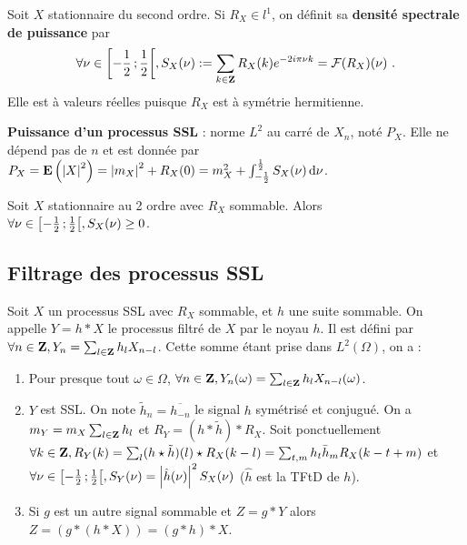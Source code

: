 	\begin{defn}
		Soit $X$ stationnaire du second ordre.
		Si $R_X \in l^1$, on définit sa \textbf{densité spectrale de puissance} par
		\vspace{-0.15cm}$$
		\forall \nu \in \intfo{-\frac{1}{2}}{\frac{1}{2}}, S_X(\nu) := \sum_{k \in \Z} R_X(k) e^{-2i\pi \nu k} = \mathcal{F}(R_X)(\nu)\ .
		\vspace{-0.15cm}$$
		Elle est à valeurs réelles puisque $R_X$ est à symétrie hermitienne.
	\end{defn}
	
	\begin{defn}
	\textbf{Puissance d'un processus SSL} : norme $L^2$ au carré de $X_n$, noté $P_X$.
	Elle ne dépend pas de $n$ et est donnée par $P_X = \mathbf{E} \left( \left\lvert X\right\rvert^2 \right) = \left\lvert m_X\right\rvert^2 + R_X(0) = m_X^2 + \int_{-\frac{1}{2}}^{\frac{1}{2}} S_X(\nu) \mathop{}\mathopen{}\mathrm{d} \nu$.
	\end{defn}
	
	\begin{pop}
		Soit $X$ stationnaire au 2 ordre avec $R_X$ sommable.
		Alors $\forall \nu \in \mathopen{}\mathclose{\left[-\frac{1}{2}\mathclose{}\mathpunct{};\frac{1}{2}\right[}, S_X(\nu) \geq 0$.
	\end{pop}

\subsection{Filtrage des processus SSL}

	\begin{pop}
		Soit $X$ un processus SSL avec $R_X$ sommable, et $h$ une suite sommable.
		On appelle $Y = h * X$ le processus filtré de $X$ par le noyau $h$.
		Il est défini par $\forall n \in \mathbf{Z}, Y_n = \sum_{l \in \mathbf{Z}} h_l X_{n - l}$.
		Cette somme étant prise dans $L^2(\Omega)$, on a :
		\begin{enumerate}
		\item
			Pour presque tout $\omega \in \Omega$, $\forall n \in \mathbf{Z}, Y_n(\omega) = \sum_{l \in \mathbf{Z}} h_l X_{n - l}(\omega)$.
		\item
			$Y$ est SSL. On note $\tilde{h}_n = \overline{h_{-n}}$ le signal $h$ symétrisé et conjugué.
			On a $m_Y = m_X \sum_{l \in \mathbf{Z}} h_l$ et $R_Y = (h * \tilde{h}) * R_X$.
			Soit ponctuellement
			$\forall k \in \mathbf{Z}, R_Y(k) = \sum_l (h \star \tilde{h})(l) \star R_X(k - l) = \sum_{t,m} h_t \bar{h}_m R_X(k - t + m)$
			et
			$\forall \nu \in \mathopen{}\mathclose{\left[-\frac{1}{2}\mathclose{}\mathpunct{};\frac{1}{2}\right[}, S_Y(\nu) = \left\lvert\hat{h}(\nu)\right\rvert^2 S_X(\nu)$ ($\hat{h}$ est la TFtD de $h$).
		\item
			Si $g$ est un autre signal sommable et $Z = g * Y$ alors $Z = (g * (h * X)) = (g * h) * X$.
		\end{enumerate}
	\end{pop}

